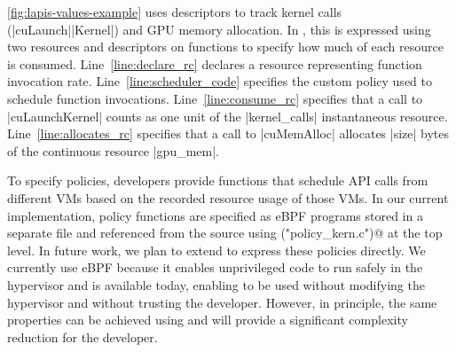 {\autoref{fig:lapis-values-example} uses descriptors to track kernel calls (\spec|cuLaunch|\-\spec|Kernel|) and GPU memory allocation.
In \Lapis, this is expressed using two resources and descriptors on functions to specify how much of each resource is consumed.
Line~\ref{line:declare_rc} declares a resource representing function invocation rate.
Line~\ref{line:scheduler_code} specifies the custom policy used to schedule function invocations.
Line~\ref{line:consume_rc} specifies that a call to \spec|cuLaunchKernel| counts as one unit of the \spec|kernel_calls| instantaneous resource.
Line~\ref{line:allocates_rc} specifies that a call to \spec|cuMemAlloc| allocates \spec|size| bytes of the continuous resource \spec|gpu_mem|.



To specify policies, developers provide functions that schedule API calls from different VMs based on the recorded resource usage of those VMs. In our current implementation, policy functions are specified as eBPF programs stored in a separate file and referenced from the \Lapis source using \spec@policy("policy_kern.c")@ at the top level. In future work, we plan
to extend \Lapis to express these policies directly. We currently use eBPF because it enables unprivileged code to run
safely in the hypervisor and is available today, enabling \AvA to be used without modifying the hypervisor and without trusting the developer. However, in principle, the same properties can be achieved using \Lapis
and will provide a significant complexity reduction for the developer.





}

